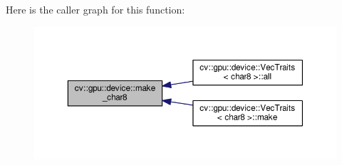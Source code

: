 Here is the caller graph for this function\-:\nopagebreak
\begin{figure}[H]
\begin{center}
\leavevmode
\includegraphics[width=350pt]{namespacecv_1_1gpu_1_1device_a7e825b36136dde7443355c1d1f29fcc0_icgraph}
\end{center}
\end{figure}


